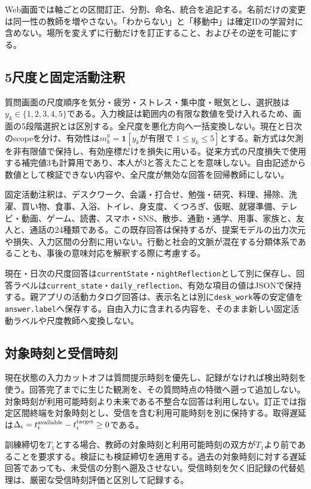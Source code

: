 Web画面では軸ごとの区間訂正、分割、命名、統合を追記する。名前だけの変更は同一性の教師を増やさない。「わからない」と「移動中」は確定IDの学習対に含めない。場所を変えずに行動だけを訂正すること、およびその逆を可能にする。

\subsection{5尺度と固定活動注釈}
\label{sec:scales-and-activity-labels}

質問画面の尺度順序を気分・疲労・ストレス・集中度・眠気とし、選択肢は\(y_k\in\{1,2,3,4,5\}\)である。入力検証は範囲内の有限な数値を受け入れるため、画面の5段階選択とは区別する。全尺度を悪化方向へ一括変換しない。現在と日次のscopeを分け、有効性は\(m_k^y=\mathbf1[y_k\text{が有限で }1\le y_k\le5]\)とする。新方式は欠測を非有限値で保持し、有効座標だけを損失に用いる。従来方式の尺度損失で使用する補完値3も計算用であり、本人が3と答えたことを意味しない。自由記述から数値として検証できない内容や、全尺度が無効な回答を回帰教師にしない。

固定活動注釈は、デスクワーク、会議・打合せ、勉強・研究、料理、掃除、洗濯、買い物、食事、入浴、トイレ、身支度、くつろぎ、仮眠、就寝準備、テレビ・動画、ゲーム、読書、スマホ・SNS、散歩、通勤・通学、用事、家族と、友人と、通話の24種類である。この既存回答は保持するが、提案モデルの出力次元や損失、入力区間の分割に用いない。行動と社会的文脈が混在する分類体系であることも、事後の意味対応を解釈する際に考慮する。

現在・日次の尺度回答は\texttt{currentState}・\texttt{nightReflection}として別に保存し、回答ラベルは\texttt{current\_state}・\texttt{daily\_reflection}、有効な項目の値はJSONで保持する。親アプリの活動カタログ回答は、表示名とは別に\texttt{desk\_work}等の安定値を\texttt{answer.label}へ保存する。自由入力に含まれる内容を、そのまま新しい固定活動ラベルや尺度教師へ変換しない。

\subsection{対象時刻と受信時刻}

現在状態の入力カットオフは質問提示時刻を優先し、記録がなければ検出時刻を使う。回答完了までに生じた観測を、その質問時点の特徴へ遡って追加しない。対象時刻が利用可能時刻より未来である不整合な回答は利用しない。訂正では指定区間終端を対象時刻とし、受信を含む利用可能時刻を別に保持する。取得遅延は\(\Delta_i=t_i^{\rm available}-t_i^{\rm target}\ge0\)である。

訓練締切を\(T_1\)とする場合、教師の対象時刻と利用可能時刻の双方が\(T_1\)より前であることを要求する。検証にも検証締切を適用する。過去の対象時刻に対する遅延回答であっても、未受信の分割へ遡及させない。受信時刻を欠く旧記録の代替処理は、厳密な受信時刻評価と区別して記録する。

